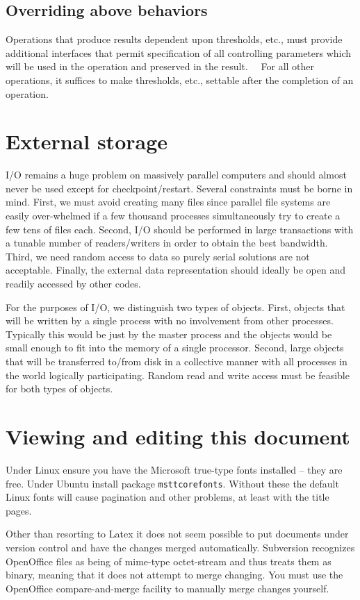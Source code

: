 \documentclass[letterpaper]{book}
\begin{document}
\subsection{Overriding above behaviors}
Operations that produce results dependent upon thresholds, etc., must provide additional interfaces that permit
specification of all controlling parameters which will be used in the operation and preserved in the result. \ \ For
all other operations, it suffices to make thresholds, etc., settable after the completion of an operation.

\section{External storage}
I/O remains a huge problem on massively parallel computers and should almost never be used except for
checkpoint/restart. Several constraints must be borne in mind. First, we must avoid creating many files since parallel
file systems are easily over-whelmed if a few thousand processes simultaneously try to create a few tens of files each.
Second, I/O should be performed in large transactions with a tunable number of readers/writers in order to obtain the
best bandwidth. Third, we need random access to data so purely serial solutions are not acceptable. Finally, the
external data representation should ideally be open and readily accessed by other codes.

For the purposes of I/O, we distinguish two types of objects. First, objects that will be written by a single process
with no involvement from other processes. Typically this would be just by the master process and the objects would be
small enough to fit into the memory of a single processor. Second, large objects that will be transferred to/from disk
in a collective manner with all processes in the world logically participating. Random read and write access must be
feasible for both types of objects.

\section[Viewing and editing this document]{Viewing and editing this document}
Under Linux ensure you have the Microsoft true-type fonts installed -- they are free. Under Ubuntu install package
\texttt{msttcorefonts}. Without these the default Linux fonts will cause pagination and other problems, at least with
the title pages.

Other than resorting to Latex it does not seem possible to put documents under version control and have the changes
merged automatically. Subversion recognizes OpenOffice files as being of mime-type octet-stream and thus treats them as
binary, meaning that it does not attempt to merge changing. You must use the OpenOffice compare-and-merge facility to
manually merge changes yourself.


\bigskip
\end{document}
